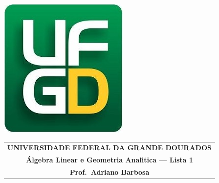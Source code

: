 \documentclass[a4paper,5pt]{amsbook}
\begin{document}
\thispagestyle{empty}
\begin{minipage}[h]{0.14\textwidth}
	\includegraphics[scale=0.24]{../../ufgd.png}
\end{minipage}
\begin{minipage}[h]{\textwidth}
\begin{tabular}{c}
{{\bf UNIVERSIDADE FEDERAL DA GRANDE DOURADOS}}\\
{{\bf \'{A}lgebra Linear e Geometria Anal\'{\i}tica --- Lista 1}}\\
{{\bf Prof.\ Adriano Barbosa}}\\
\end{tabular}
\vspace{-0.45cm}
%
\end{minipage}

\vspace{1cm}
\end{document}
